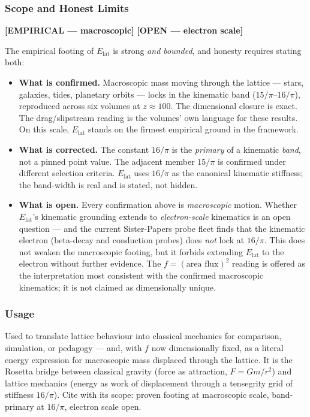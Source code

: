 \documentclass[12pt,oneside]{book}
\begin{document}
\subsubsection{Scope and Honest Limits}
 
\begin{center}
{\color{empiricaltag}\textbf{[EMPIRICAL --- macroscopic]}}\quad
{\color{theorytag}\textbf{[OPEN --- electron scale]}}
\end{center}
 
The empirical footing of $E_{\mathrm{lat}}$ is strong \emph{and bounded}, and honesty
requires stating both:
 
\begin{itemize}
  \item \textbf{What is confirmed.} Macroscopic mass moving through the lattice --- stars,
  galaxies, tides, planetary orbits --- locks in the kinematic band ($15/\pi$--$16/\pi$),
  reproduced across six volumes at $z \approx 100$. The dimensional closure is exact. The
  drag/slipstream reading is the volumes' own language for these results. On this scale,
  $E_{\mathrm{lat}}$ stands on the firmest empirical ground in the framework.
 
  \item \textbf{What is corrected.} The constant $16/\pi$ is the \emph{primary} of a
  kinematic \emph{band}, not a pinned point value. The adjacent member $15/\pi$ is
  confirmed under different selection criteria. $E_{\mathrm{lat}}$ uses $16/\pi$ as the
  canonical kinematic stiffness; the band-width is real and is stated, not hidden.
 
  \item \textbf{What is open.} Every confirmation above is \emph{macroscopic} motion.
  Whether $E_{\mathrm{lat}}$'s kinematic grounding extends to \emph{electron-scale}
  kinematics is an open question --- and the current Sister-Papers probe fleet finds that
  the kinematic electron (beta-decay and conduction probes) does \emph{not} lock at
  $16/\pi$. This does not weaken the macroscopic footing, but it forbids extending
  $E_{\mathrm{lat}}$ to the electron without further evidence. The $f = (\text{area
  flux})^{2}$ reading is offered as the interpretation most consistent with the confirmed
  macroscopic kinematics; it is not claimed as dimensionally unique.
\end{itemize}
 
\subsubsection{Usage}
Used to translate lattice behaviour into classical mechanics for comparison, simulation,
or pedagogy --- and, with $f$ now dimensionally fixed, as a literal energy expression for
macroscopic mass displaced through the lattice. It is the Rosetta bridge between classical
gravity (force as attraction, $F = Gm/r^{2}$) and lattice mechanics (energy as work of
displacement through a tensegrity grid of stiffness $16/\pi$). Cite with its scope: proven
footing at macroscopic scale, band-primary at $16/\pi$, electron scale open.
\end{document}
